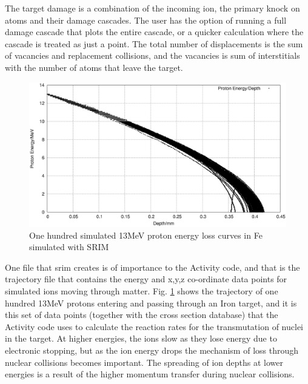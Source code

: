 The target damage is a combination of the incoming ion, the primary knock on atoms and their damage cascades.  The user has the option of running a full damage cascade that plots the entire cascade, or a quicker calculation where the cascade is treated as just a point.  The total number of displacements is the sum of vacancies and replacement collisions, and the vacancies is sum of interstitials with the number of atoms that leave the target.

\begin{figure}
  \begin{center}
    \includegraphics[width=.7\linewidth]{chapters/isotope_activation_and_radioactive_decay/plots/fe_13MeV.eps}
    \caption{One hundred simulated 13MeV proton energy loss curves in Fe simulated with SRIM \cite{srim}}
    \label{fig:fe13traj}
  \end{center}
\end{figure}

One file that \acrshort{srim} creates is of importance to the Activity code, and that is the trajectory file that contains the energy and x,y,z co-ordinate data points for simulated ions moving through matter.  Fig. \ref{fig:fe13traj} shows the trajectory of one hundred 13MeV protons entering and passing through an Iron target, and it is this set of data points (together with the cross section database) that the Activity code uses to calculate the reaction rates for the transmutation of nuclei in the target.  At higher energies, the ions slow as they lose energy due to electronic stopping, but as the ion energy drops the mechanism of loss through nuclear collisions becomes important.  The spreading of ion depths at lower energies is a result of the higher momentum transfer during nuclear collisions.









